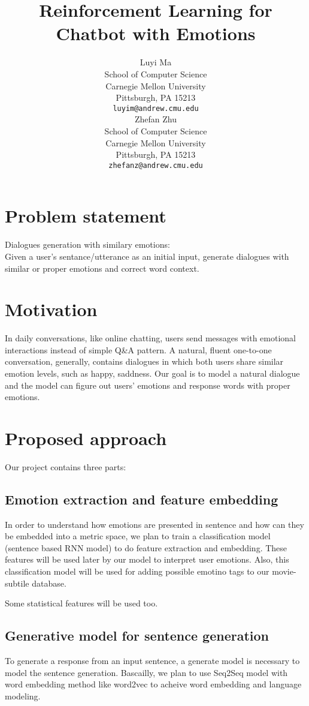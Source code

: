 \documentclass{article}
\title{Reinforcement Learning for Chatbot with Emotions}
\author{
  Luyi Ma \\
  School of Computer Science\\
  Carnegie Mellon University\\
  Pittsburgh, PA 15213 \\
  \texttt{luyim@andrew.cmu.edu} \\
  \And
  Zhefan Zhu \\
  School of Computer Science \\
  Carnegie Mellon University\\
  Pittsburgh, PA 15213 \\
  \texttt{zhefanz@andrew.cmu.edu} \\  
}
\begin{document}

\maketitle



\section{Problem statement}
Dialogues generation with similary emotions: \\
Given a user's sentance/utterance as an initial input, generate dialogues with similar or proper emotions and correct word context.



\section{Motivation}
In daily conversations, like online chatting, users send messages with emotional interactions instead of simple Q\&A pattern. A natural, fluent one-to-one conversation, generally, contains dialogues in which both users share similar emotion levels, such as happy, saddness. Our goal is to model a natural dialogue and the model can figure out users' emotions and response words with proper emotions.




\section{Proposed approach}
Our project contains three parts:


\subsection{Emotion extraction and feature embedding}
In order to understand how emotions are presented in sentence and how can they be embedded into a metric space, we plan to train a classification model (sentence based RNN model) to do feature extraction and embedding. These features will be used later by our model to interpret user emotions. Also, this classification model will be used for adding possible emotino tags to our movie-subtile database. \par
Some statistical features will be used too.





\subsection{Generative model for sentence generation}
To generate a response from an input sentence, a generate model is necessary to model the sentence generation. Bascailly, we plan to use Seq2Seq model with word embedding method like word2vec to acheive word embedding and language modeling.
\end{document}
